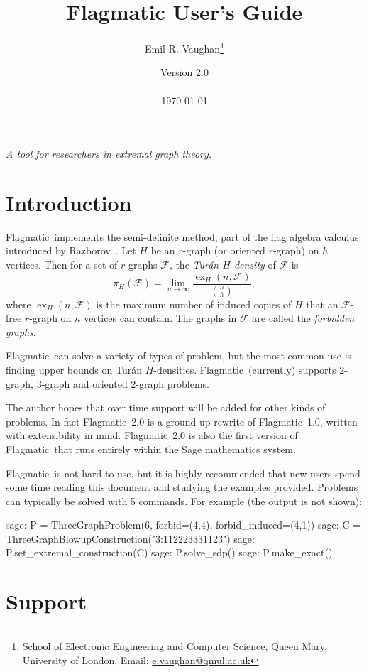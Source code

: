 \documentclass{article}
\title{\color{flagcolor} Flagmatic User's Guide}
\author{
Emil R. Vaughan\thanks{School of Electronic Engineering and Computer Science, Queen Mary, University of London. Email: \url{e.vaughan@qmul.ac.uk}} \\
}
\date{Version 2.0 \\ \ \\ \today}
\providecommand{\flagmatic}{Flagmatic}
\DeclareMathOperator{\ex}{ex}
\begin{document}
\maketitle

\begin{center}
\emph{A tool for researchers in extremal graph theory.} 
\end{center}

\section{Introduction} \label{intro}

\flagmatic\ implements the semi-definite method, part of the flag algebra calculus introduced by Razborov~\cite{R07}. Let $H$ be an $r$-graph (or oriented $r$-graph) on $h$ vertices. Then for a set of $r$-graphs $\mathcal{F}$, the \emph{Tur\'an $H$-density} of $\mathcal{F}$ is
\[\pi_{H}(\mathcal{F})= \lim_{n\rightarrow \infty}\frac{\ex_{H}(n, \mathcal{F})}{\binom{n}{h}}, \]
where $\ex_{H}(n, \mathcal{F})$ is the maximum number of induced copies of $H$ that an $\mathcal{F}$-free $r$-graph on $n$ vertices can contain. The graphs in $\mathcal{F}$ are called the \emph{forbidden graphs}.

\flagmatic\ can solve a variety of types of problem, but the most common use is finding upper bounds on Tur\'an $H$-densities. \flagmatic\ (currently) supports $2$-graph, $3$-graph and oriented $2$-graph problems.

The author hopes that over time support will be added for other kinds of problems. In fact \flagmatic\ 2.0 is a ground-up rewrite of \flagmatic\ 1.0, written with extensibility in mind. \flagmatic\ 2.0 is also the first version of \flagmatic\ that runs entirely within the Sage mathematics system.

\flagmatic\ is not hard to use, but it is highly recommended that new users spend some time reading this document and studying the examples provided. Problems can typically be solved with 5 commands. For example (the output is not shown):

\begin{sage}
sage: P = ThreeGraphProblem(6, forbid=(4,4), forbid_induced=(4,1))
sage: C = ThreeGraphBlowupConstruction("3:112223331123")
sage: P.set_extremal_construction(C)
sage: P.solve_sdp()
sage: P.make_exact()
\end{sage}


\section{Support} \label{support}
\end{document}
